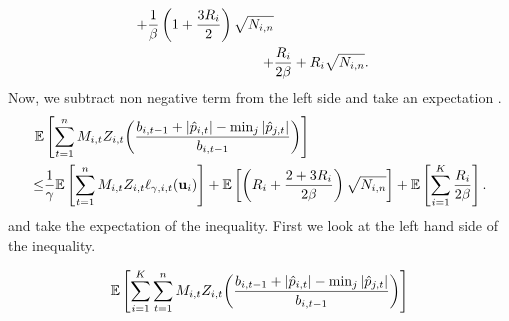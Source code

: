 {\begin{equation*}
\begin{split}
+\frac{1}{\beta}\left({1+\frac{3R_{i}}{2}}\right)\sqrt{N_{i,n}}
\\
+&\frac{R_i}{2\beta}+R_{i}\sqrt{N_{i,n}}.
\end{split}
\end{equation*}
Now, we subtract non negative term from the left side and take an  expectation .
\begin{equation*}
\begin{split}  
\mathbb{E}&\left[{\sum_{t=1}^{n}M_{i,t}Z_{i,t}{\left({\frac{b_{i,t-1} +\left\vert{\hat{p}_{i,t}}\right\vert-\min_j\left\vert{\hat{p}_{j,t}}\right\vert}{b_{i,t-1}}}\right)}}\right]\\
\le &\frac{1}{\gamma}\mathbb{E}\left[{\sum_{t=1}^{n}{M_{i,t}Z_{i,t}}\ell_{\gamma,i,t}(\mathbf{u}_i)}\right]
+\mathbb{E}\left[{\left({R_{i}+\frac{2+3R_{i}}{2\beta}}\right)\sqrt{N_{i,n}}}\right]
+\mathbb{E}\left[{\sum_{i=1}^{K}\frac{R_i}{2\beta}}\right].
\end{split}
\end{equation*}
and take the expectation of the inequality. First we look at the left hand side of the inequality.

\begin{equation*}
\begin{split}
\mathbb{E}&\left[{\sum_{i=1}^{K}\sum_{t=1}^{n}M_{i,t}Z_{i,t}{\left({\frac{b_{i,t-1} +\left\vert{\hat{p}_{i,t}}\right\vert-\min_j\left\vert{\hat{p}_{j,t}}\right\vert}{b_{i,t-1}}}\right)}}\right]\\
&~
\end{split}
\end{equation*}
\QED



}
